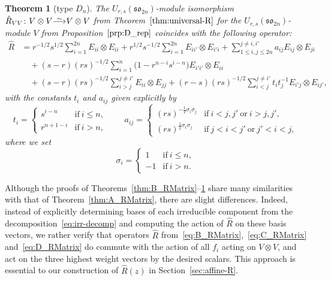 \documentclass[10pt,a4paper]{amsart}
\numberwithin{equation}{section}
\newtheorem{Theorem}{Theorem}[section]
\newcommand{\sso}{\mathfrak{so}}
\newcommand\iso{ \vphantom{j^{X^2}}\smash{\overset{\sim}{\vphantom{\rule{0pt}{0.20em}}\smash{\longrightarrow}}} }
\begin{document}
\begin{Theorem}[type $D_{n}$]\label{thm:D_RMatrix}
The $U_{r,s}(\sso_{2n})$-module isomorphism $\hat{R}_{VV}\colon V \otimes V \iso V \otimes V$ from Theorem~$\ref{thm:universal-R}$ for the $U_{r,s}(\sso_{2n})$-module $V$ from Proposition~$\ref{prp:D_rep}$ coincides with the following operator:
\begin{align}
 \hat{R} &{}=
 r^{-1/2}s^{1/2}\sum_{i = 1}^{2n} E_{ii} \otimes E_{ii}
 + r^{1/2}s^{-1/2}\sum_{i = 1}^{2n}E_{ii'} \otimes E_{i'i}+ \sum_{1\leq i,j\leq 2n}^{j \neq i,i'} a_{ij}E_{ij} \otimes E_{ji} \nonumber\\
 &\quad{}
 + (s - r)(rs)^{-1/2}\sum_{i = 1}^{n} \bigl(1 - r^{n- i}s^{i - n}\bigr) E_{i'i'} \otimes E_{ii} \nonumber\\
 &\quad{} + (s -r)(rs)^{-1/2}\sum_{i > j}^{j \neq i'} E_{ii} \otimes E_{jj}
 + (r - s)(rs)^{-1/2}\sum_{i < j}^{j \neq i'} t_{i}t_{j}^{-1}E_{i'j} \otimes E_{ij'} ,\label{eq:D_RMatrix}
 \end{align}
with the constants $t_i$ and $a_{ij}$ given explicitly by
\begin{equation}\label{eq:D_coeffs}
 t_{i} =
 \begin{cases}
 s^{i - n} & \text{if}\ i \le n, \\
 r^{n + 1 - i} & \text{if}\ i > n,
 \end{cases} \qquad
 a_{ij} =
 \begin{cases}
 (rs)^{-\frac{1}{2}\sigma_{i}\sigma_{j}} & \text{if}\ i < j,j'\ \text{or}\ i > j,j', \\
 (rs)^{\frac{1}{2}\sigma_{i}\sigma_{j}} & \text{if}\ j < i < j'\ \text{or}\ j' < i < j,
 \end{cases}
\end{equation}
where we set
\begin{displaymath}
 \sigma_{i} =
 \begin{cases}
 1 & \text{if}\ i \le n, \\
 -1 & \text{if}\ i > n.
 \end{cases}
\end{displaymath}
\end{Theorem}


\begin{Remark}
Although the proofs of Theorems~\ref{thm:B_RMatrix}--\ref{thm:D_RMatrix} share many similarities with that of Theorem~\ref{thm:A_RMatrix}, there are slight differences. Indeed, instead of explicitly determining bases of each irreducible component from the decomposition~\eqref{eq:irr-decomp} and computing the action of $\hat{R}$ on these basis vectors, we rather verify that operators $\hat{R}$ from~\eqref{eq:B_RMatrix},~\eqref{eq:C_RMatrix} and~\eqref{eq:D_RMatrix} do commute with the action of all $f_i$ acting on $V\otimes V$, and act on the three highest weight vectors by the desired scalars. This approach is essential to our construction of $\hat{R}(z)$ in Section~\ref{sec:affine-R}.
\end{Remark}
\end{document}
